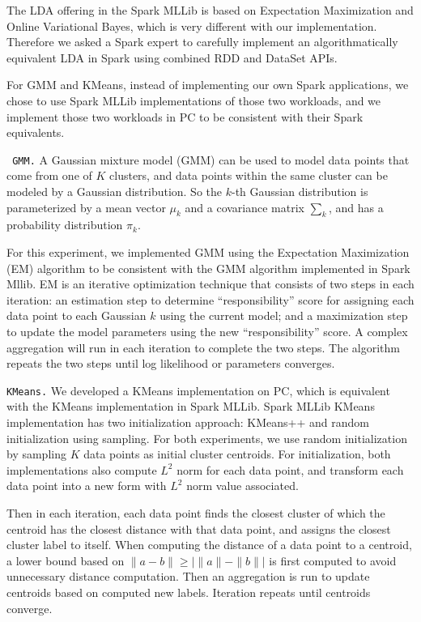 \vspace{5pt}
The LDA offering in the Spark MLLib is based on Expectation
Maximization and Online Variational Bayes, which is very different
with our implementation. Therefore we asked a Spark expert to carefully implement an algorithmatically
equivalent LDA in Spark using combined RDD and DataSet        
APIs. 

For GMM and KMeans, instead of implementing
our own Spark applications, we chose to use Spark MLLib
implementations of those two workloads, and we implement those two
workloads in PC to be consistent with their Spark equivalents.

\vspace{5pt}
\noindent
\texttt { GMM.} A Gaussian mixture model (GMM) can be used to model data points that come
from one of $K$ clusters, and data points within the same cluster
can be modeled by a Gaussian distribution. So the $k$-th Gaussian
distribution is parameterized by a mean vector $\mu_k$ and a covariance
matrix $\sum_k$, and has a probability distribution $\pi_k$.

For this experiment, we
implemented GMM using the Expectation Maximization (EM) algorithm to be
consistent with the GMM algorithm implemented in Spark Mllib. EM is an
iterative optimization technique that consists of two steps in each
iteration: an estimation step to determine ``responsibility'' score
for assigning each data point to each Gaussian $k$ using the current model; and a maximization step to
update the model parameters using the new ``responsibility'' score. A complex
aggregation will run in each iteration to complete the two steps. The algorithm repeats
the two steps until log likelihood or parameters converges. 


\vspace{5pt}
\noindent
\texttt {KMeans.} We developed a KMeans implementation on PC, which
is equivalent with the KMeans implementation in Spark MLLib. Spark
MLLib KMeans implementation has two initialization approach: KMeans++
and random initialization using sampling. For both experiments, we use
random initialization by sampling $K$ data points as initial
cluster centroids. For initialization, both implementations also compute $L^2$ norm for each data
point, and transform each data point into a new form with $L^2$ norm value
associated. 

Then in each iteration, each data point finds the closest cluster
of which the centroid has the closest distance with that data point, and assigns the closest
cluster label to itself. When computing the distance of a data point to a
centroid, a lower bound based on $\|a - b\| \geq |\|a\| - \|b\||$ is
first computed to avoid unnecessary distance computation. Then an aggregation is run to update centroids
based on computed new labels. Iteration repeats until centroids
converge.

